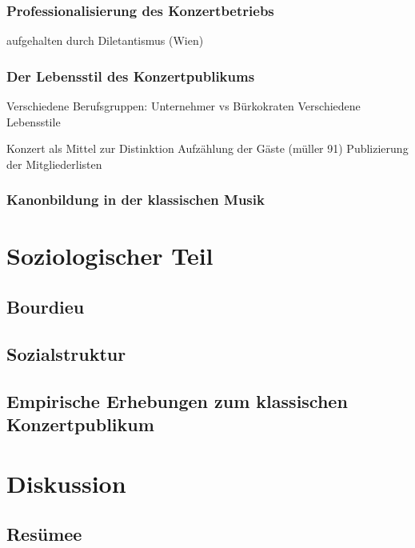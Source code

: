 \documentclass[a4paper, german, oneside]{scrbook}
\begin{document}
\section{Professionalisierung des Konzertbetriebs}
\label{professionalisierung}
aufgehalten durch Diletantismus (Wien)
\section{Der Lebensstil des Konzertpublikums} %
\label{lebensstil}

Verschiedene Berufsgruppen: Unternehmer vs Bürkokraten
Verschiedene Lebensstile

Konzert als Mittel zur Distinktion
Aufzählung der Gäste (müller 91)
Publizierung der Mitgliederlisten


\section{Kanonbildung in der klassischen Musik}


\part{Soziologischer Teil}
\chapter{Bourdieu}

\chapter{Sozialstruktur}

\chapter{Empirische Erhebungen zum klassischen Konzertpublikum}

\part{Diskussion}
\chapter{Resümee}




\printbibliography
\end{document}
